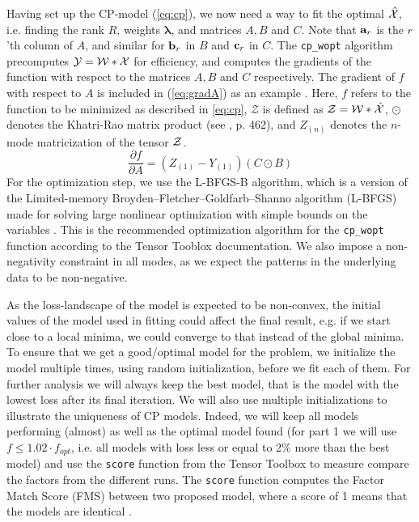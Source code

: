 Having set up the CP-model (\ref{eq:cp}), we now need a way to fit the optimal $\mathcal{\hat{X}}$, i.e. finding the rank $R$, weights $\boldsymbol{\lambda}$, and matrices $A, B$ and $C$.
Note that $\mathbf{a}_r$ is the $r$'th column of $A$, and similar for $\mathbf{b}_r$ in $B$ and $\mathbf{c}_r$ in $C$.
The \texttt{cp\_wopt} algorithm precomputes $\mathcal{Y} = \mathcal{W} * \mathcal{X}$ for efficiency, and computes the gradients of the function with respect to the matrices $A, B$ and $C$ respectively.
The gradient of $f$ with respect to $A$ is included in (\ref{eq:gradA}) as an example \cite{cp-wopt}.
Here, $f$ refers to the function to be minimized as described in \ref{eq:cp}, $\mathcal{Z}$ is defined as $\mathcal{Z} = \mathcal{W} * \mathcal{\hat{X}}$, $\odot$ denotes the Khatri-Rao matrix product (see \textcite{tensor-review}, p. 462), and $Z_{(n)}$ denotes the $n$-mode matricization of the tensor $\mathcal{Z}$.
\begin{equation}
    \frac{\partial f}{\partial A} = (Z_{(1)} - Y_{(1)})(C \odot B) 
    \label{eq:gradA}
\end{equation}
For the optimization step, we use the L-BFGS-B algorithm, which is a version of the Limited-memory Broyden–Fletcher–Goldfarb–Shanno algorithm (L-BFGS) made for solving large nonlinear optimization with simple bounds on the variables \cite{lbfgsb}.
This is the recommended optimization algorithm for the \texttt{cp\_wopt} function according to the Tensor Tooblox documentation.
We also impose a non-negativity constraint in all modes, as we expect the patterns in the underlying data to be non-negative.

As the loss-landscape of the model is expected to be non-convex, the initial values of the model used in fitting could affect the final result, e.g. if we start close to a local minima, we could converge to that instead of the global minima.
To ensure that we get a good/optimal model for the problem, we initialize the model multiple times, using random initialization, before we fit each of them.
For further analysis we will always keep the best model, that is the model with the lowest loss after its final iteration.
We will also use multiple initializations to illustrate the uniqueness of CP models.
Indeed, we will keep all models performing (almost) as well as the optimal model found (for part 1 we will use $f \leq 1.02\cdot f_{opt}$, i.e. all models with loss less or equal to 2\% more than the best model) and use the \texttt{score} function from the Tensor Toolbox \cite{tentool} to measure compare the factors from the different runs.
The \texttt{score} function computes the Factor Match Score (FMS) between two proposed model, where a score of 1 means that the models are identical \cite{unique}.

